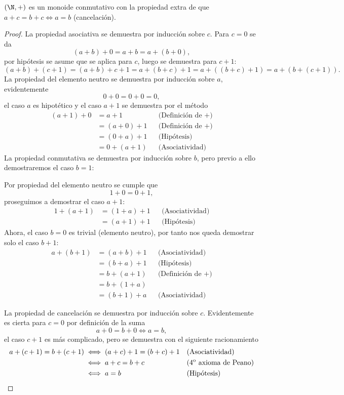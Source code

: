 \documentclass[11pt,oneside,a4paper]{book}
\begin{document}
\begin{thm}
$(\N,+)$ es un monoide conmutativo con la propiedad extra de que $a+c=b+c\iff a=b$ (cancelación).
\end{thm}
\begin{proof}
La propiedad asociativa se demuestra por inducción sobre $c$. Para $c=0$ se da
$$(a+b)+0=a+b=a+(b+0),$$
por hipótesis se asume que se aplica para $c$, luego se demuestra para $c+1$:
$$(a+b)+(c+1)=(a+b)+c+1=a+(b+c)+1=a+((b+c)+1)=a+(b+(c+1)).$$
La propiedad del elemento neutro se demuestra por inducción sobre $a$, evidentemente
$$0+0=0+0=0,$$
el caso $a$ es hipotético y el caso $a+1$ se demuestra por el método
$$\begin{aligned}
(a+1)+0&=a+1 &&\text{(Definición de +)}\\
&=(a+0)+1 &&\text{(Definición de +)}\\
&=(0+a)+1 &&\text{(Hipótesis)}\\
&=0+(a+1) &&\text{(Asociatividad)}
\end{aligned}$$
La propiedad conmutativa se demuestra por inducción sobre $b$, pero previo a ello demostraremos el caso $b=1$:

Por propiedad del elemento neutro se cumple que
$$1+0=0+1,$$
proseguimos a demostrar el caso $a+1$:
$$\begin{aligned}
1+(a+1)&=(1+a)+1 &&\text{(Asociatividad)}\\
&=(a+1)+1 &&\text{(Hipótesis)}
\end{aligned}$$
Ahora, el caso $b=0$ es trivial (elemento neutro), por tanto nos queda demostrar solo el caso $b+1$:
$$\begin{aligned}
a+(b+1)&=(a+b)+1 &&\text{(Asociatividad)}\\
&=(b+a)+1 &&\text{(Hipótesis)}\\
&=b+(a+1) &&\text{(Definición de +)}\\
&=b+(1+a)\\
&=(b+1)+a &&\text{(Asociatividad)}
\end{aligned}$$

La propiedad de cancelación se demuestra por inducción sobre $c$. Evidentemente es cierta para $c=0$ por definición de la suma
$$a+0=b+0\iff a=b,$$
el caso $c+1$ es más complicado, pero se demuestra con el siguiente racionamiento
$$\begin{aligned}
a+(c+1)=b+(c+1)&\iff (a+c)+1=(b+c)+1 &&\text{(Asociatividad)}\\
&\iff a+c=b+c &&\text{(4\textsuperscript{o} axioma de Peano)}\\
&\iff a=b &&\text{(Hipótesis)}
\end{aligned}$$
\end{proof}
\end{document}
